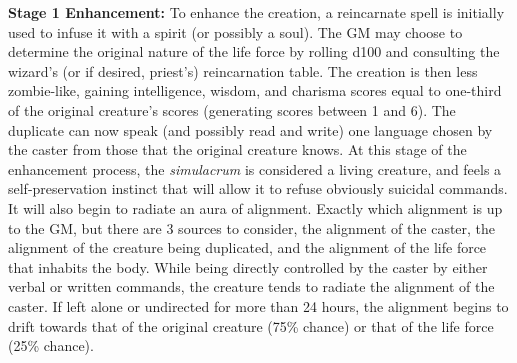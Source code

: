 \begin{multicols}{2}
\textbf{Stage 1 Enhancement:} To enhance the creation, a reincarnate spell is initially used to infuse it with a spirit (or possibly a soul).  The GM may choose to determine the original nature of the life force by rolling d100 and consulting the wizard's (or if desired, priest's) reincarnation table.  The creation is then less zombie-like, gaining intelligence, wisdom, and charisma scores equal to one-third of the original creature's scores (generating scores between 1 and 6).  The duplicate can now speak (and possibly read and write) one language chosen by the caster from those that the original creature knows.  At this stage of the enhancement process, the \textit{simulacrum} is considered a living creature, and feels a self-preservation instinct that will allow it to refuse obviously suicidal commands.  It will also begin to radiate an aura of alignment.  Exactly which alignment is up to the GM, but there are 3 sources to consider, the alignment of the caster, the alignment of the creature being duplicated, and the alignment of the life force that inhabits the body.  While being directly controlled by the caster by either verbal or written commands, the creature tends to radiate the alignment of the caster.  If left alone or undirected for more than 24 hours, the alignment begins to drift towards that of the original creature (75\% chance) or that of the life force (25\% chance).  


\end{multicols}
